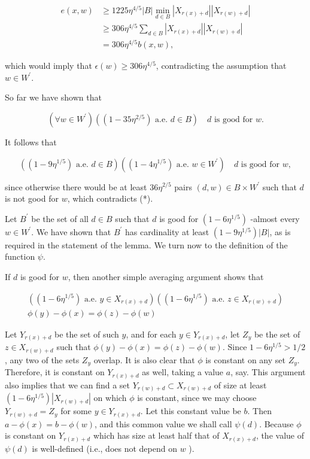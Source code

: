\documentclass[10pt]{article}
\begin{document}
$$
\begin{aligned}
e(x, w) & \geqslant 1225 \eta^{4 / 5}|B| \min _{d \in B}\left|X_{r(x)+d}\right|\left|X_{r(w)+d}\right| \\
& \geqslant 306 \eta^{4 / 5} \sum_{d \in B}\left|X_{r(x)+d}\right|\left|X_{r(w)+d}\right| \\
& =306 \eta^{4 / 5} b(x, w),
\end{aligned}
$$

which would imply that $\epsilon(w) \geqslant 306 \eta^{4 / 5}$, contradicting the assumption that $w \in W^{\prime}$.

So far we have shown that


\begin{equation*}
\left(\forall w \in W^{\prime}\right)\left(\left(1-35 \eta^{2 / 5}\right) \text { a.e. } d \in B\right) \quad d \text { is good for } w . \tag{*}
\end{equation*}


It follows that

$$
\left(\left(1-9 \eta^{1 / 5}\right) \text { a.e. } d \in B\right)\left(\left(1-4 \eta^{1 / 5}\right) \text { a.e. } w \in W^{\prime}\right) \quad d \text { is good for } w,
$$

since otherwise there would be at least $36 \eta^{2 / 5}$ pairs $(d, w) \in B \times W^{\prime}$ such that $d$ is not good for $w$, which contradicts (*).

Let $B^{\prime}$ be the set of all $d \in B$ such that $d$ is good for $\left(1-6 \eta^{1 / 5}\right)$ -almost every $w \in W^{\prime}$. We have shown that $B^{\prime}$ has cardinality at least $\left(1-9 \eta^{1 / 5}\right)|B|$, as is required in the statement of the lemma. We turn now to the definition of the function $\psi$.

If $d$ is good for $w$, then another simple averaging argument shows that

$$
\begin{gathered}
\left(\left(1-6 \eta^{1 / 5}\right) \text { a.e. } y \in X_{r(x)+d}\right)\left(\left(1-6 \eta^{1 / 5}\right) \text { a.e. } z \in X_{r(w)+d}\right) \\
\phi(y)-\phi(x)=\phi(z)-\phi(w)
\end{gathered}
$$

Let $Y_{r(x)+d}$ be the set of such $y$, and for each $y \in Y_{r(x)+d}$, let $Z_{y}$ be the set of $z \in X_{r(w)+d}$ such that $\phi(y)-\phi(x)=\phi(z)-\phi(w)$. Since $1-6 \eta^{1 / 5}>1 / 2$, any two of the sets $Z_{y}$ overlap. It is also clear that $\phi$ is constant on any set $Z_{y}$. Therefore, it is constant on $Y_{r(x)+d}$ as well, taking a value $a$, say. This argument also implies that we can find a set $Y_{r(w)+d} \subset X_{r(w)+d}$ of size at least $\left(1-6 \eta^{1 / 5}\right)\left|X_{r(w)+d}\right|$ on which $\phi$ is constant, since we may choose $Y_{r(w)+d}=Z_{y}$ for some $y \in Y_{r(x)+d}$. Let this constant value be $b$. Then $a-\phi(x)=b-\phi(w)$, and this common value we shall call $\psi(d)$. Because $\phi$ is constant on $Y_{r(x)+d}$ which has size at least half that of $X_{r(x)+d}$, the value of $\psi(d)$ is well-defined (i.e., does not depend on $w$ ).
\end{document}
